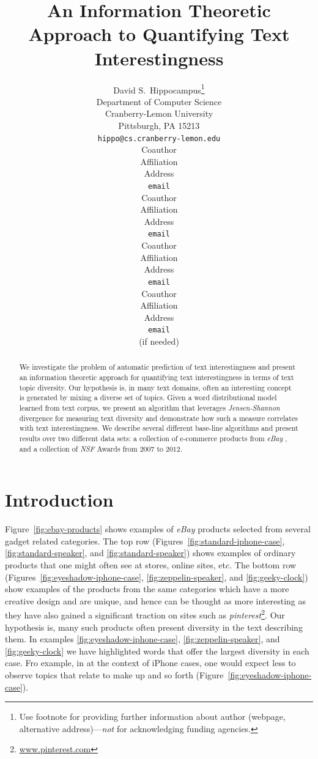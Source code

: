 \documentclass{article} %
\title{An Information Theoretic Approach to Quantifying Text Interestingness}
\author{
David S.~Hippocampus\thanks{ Use footnote for providing further information
about author (webpage, alternative address)---\emph{not} for acknowledging
funding agencies.} \\
Department of Computer Science\\
Cranberry-Lemon University\\
Pittsburgh, PA 15213 \\
\texttt{hippo@cs.cranberry-lemon.edu} \\
\And
Coauthor \\
Affiliation \\
Address \\
\texttt{email} \\
\AND
Coauthor \\
Affiliation \\
Address \\
\texttt{email} \\
\And
Coauthor \\
Affiliation \\
Address \\
\texttt{email} \\
\And
Coauthor \\
Affiliation \\
Address \\
\texttt{email} \\
(if needed)\\
}
\begin{document}
\maketitle

\begin{abstract}

We investigate the problem of automatic prediction of text interestingness and present an information theoretic approach for quantifying text interestingness in terms of text topic diversity.  Our hypothesis is, in many text domains, often an interesting concept is generated by mixing a diverse set of topics.  Given a word distributional model learned from text corpus, we present an algorithm that leverages {\sl Jensen-Shannon} divergence for measuring text diversity and demonstrate how such a measure correlates with text interestingness. We describe several different base-line algorithms and present results over two different data sets: a collection of e-commerce products from {\sl eBay} , and a collection of  {\sl NSF} Awards from $2007$ to $2012$. 
\end{abstract}



\section{Introduction}
\label{sec:introduction}

Figure~\ref{fig:ebay-products} shows examples of {\sl eBay} products selected from several gadget related categories. The top row (Figures~\ref{fig:standard-iphone-case}, \ref{fig:standard-speaker}, and \ref{fig:standard-speaker}) shows examples of ordinary products that one might often see at stores, online sites, etc. The bottom row (Figures~\ref{fig:eyeshadow-iphone-case}, \ref{fig:zeppelin-speaker}, and \ref{fig:geeky-clock}) show examples of the products from the same categories which have a more creative design and are unique, and hence can be thought as more interesting as they have also gained a significant traction on sites such as {\sl pinterest}\footnote{\url{www.pinterest.com}}. Our hypothesis is, many such products often present diversity in the text describing them. In examples \ref{fig:eyeshadow-iphone-case}, \ref{fig:zeppelin-speaker}, and \ref{fig:geeky-clock} we have highlighted words that offer the largest diversity in each case. Fro example, in at the context of iPhone cases, one would expect less to observe topics that relate to make up and so forth (Figure~\ref{fig:eyeshadow-iphone-case}). 
\end{document}
